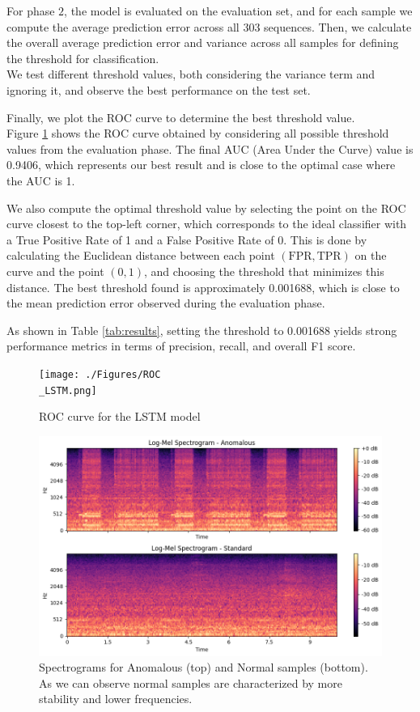 \documentclass[ngerman]{scrartcl}
\begin{document}
For phase \(2\), the model is evaluated on the evaluation set, and for each sample we compute the average prediction error across all 303 sequences.
Then, we calculate the overall average prediction error and variance across all samples for defining the threshold for classification. \\We test different threshold values, both considering the variance term and ignoring it, and observe the best performance on the test set.

Finally, we plot the ROC curve to determine the best threshold value.
\\Figure \ref{fig:rocLSTM} shows the ROC curve obtained by considering all possible threshold values from the evaluation phase. The final AUC (Area Under the Curve) value is 0.9406, which represents our best result and is close to the optimal case where the AUC is 1.

We also compute the optimal threshold value by selecting the point on the ROC curve closest to the top-left corner, which corresponds to the ideal classifier with a True Positive Rate of 1 and a False Positive Rate of 0. 
This is done by calculating the Euclidean distance between each point \((\text{FPR}, \text{TPR})\) on the curve and the point \((0, 1)\), and choosing the threshold that minimizes this distance. 
The best threshold found is approximately 0.001688, which is close to the mean prediction error observed during the evaluation phase.


As shown in Table \ref{tab:results}, setting the threshold to 0.001688 yields strong performance metrics in terms of precision, recall, and overall F1 score.

\begin{figure}[h]
    \centering
    \texttt{[image: ./Figures/ROC\\\_LSTM.png]}
    \caption{ROC curve for the LSTM model}
    \label{fig:rocLSTM}
\end{figure}

\begin{figure}[h]
    \centering
    \includegraphics[width=.5\textwidth]{./Figures/spectograms.png}
    \caption{Spectrograms for Anomalous (top) and Normal samples (bottom). As we can observe normal samples are characterized by more stability and lower frequencies.}
    \label{fig:spectograms}
\end{figure}
\end{document}
